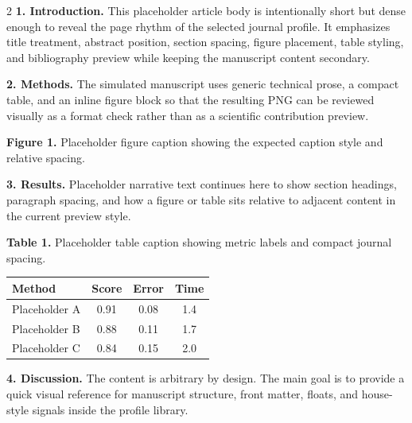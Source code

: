 \documentclass[10pt,a4paper]{article}
\begin{document}
\begin{multicols}{2}
\small
\textbf{1. Introduction.} This placeholder article body is intentionally short but dense enough to reveal the page rhythm of the selected journal profile. It emphasizes title treatment, abstract position, section spacing, figure placement, table styling, and bibliography preview while keeping the manuscript content secondary.

\textbf{2. Methods.} The simulated manuscript uses generic technical prose, a compact table, and an inline figure block so that the resulting PNG can be reviewed visually as a format check rather than as a scientific contribution preview.


\begin{center}\end{center}\noindent\textbf{Figure 1.} Placeholder figure caption showing the expected caption style and relative spacing.\par\vspace{0.5em}

\textbf{3. Results.} Placeholder narrative text continues here to show section headings, paragraph spacing, and how a figure or table sits relative to adjacent content in the current preview style.

\noindent\textbf{Table 1.} Placeholder table caption showing metric labels and compact journal spacing.\par\begin{center}
\begin{tabular}{lccc}
\toprule
Method & Score & Error & Time\\
\midrule
Placeholder A & 0.91 & 0.08 & 1.4\\
Placeholder B & 0.88 & 0.11 & 1.7\\
Placeholder C & 0.84 & 0.15 & 2.0\\
\bottomrule
\end{tabular}\end{center}\vspace{0.5em}

\textbf{4. Discussion.} The content is arbitrary by design. The main goal is to provide a quick visual reference for manuscript structure, front matter, floats, and house-style signals inside the profile library.

\end{multicols}
\end{document}
